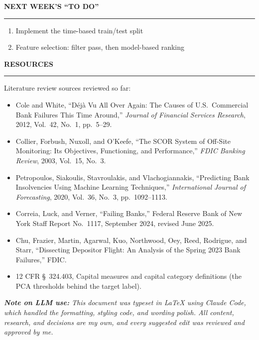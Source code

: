 \documentclass[11pt,letterpaper]{article}
\newcommand{\sectionhead}[1]{%
  \vspace{6pt}%
  {\sffamily\bfseries\fontsize{9.5}{12}\selectfont\color{navy}\MakeUppercase{#1}}\par
  \vspace{-9pt}\textcolor{hairline}{\rule{\textwidth}{0.5pt}}\par\vspace{0pt}}
\newcommand{\answer}[1]{#1\par\vspace{3pt}}
\begin{document}
\newpage
\sectionhead{Next week's ``To Do''}
\answer{\begin{enumerate}[topsep=1pt,itemsep=1pt,leftmargin=16pt,label=\textcolor{navy}{\bfseries\arabic*.}]
  \item Implement the time-based train/test split
  \item Feature selection: filter pass, then model-based ranking
\end{enumerate}}

\sectionhead{Resources}
\answer{Literature review sources reviewed so far:
\begin{itemize}[topsep=1pt,itemsep=1pt,leftmargin=14pt,label=\textcolor{navy}{\footnotesize\textbullet}]
  \item Cole and White, ``D\'{e}j\`{a} Vu All Over Again: The Causes of U.S.\ Commercial Bank Failures This Time Around,'' \textit{Journal of Financial Services Research}, 2012, Vol.\ 42, No.\ 1, pp.\ 5--29.
  \item Collier, Forbush, Nuxoll, and O'Keefe, ``The SCOR System of Off-Site Monitoring: Its Objectives, Functioning, and Performance,'' \textit{FDIC Banking Review}, 2003, Vol.\ 15, No.\ 3.
  \item Petropoulos, Siakoulis, Stavroulakis, and Vlachogiannakis, ``Predicting Bank Insolvencies Using Machine Learning Techniques,'' \textit{International Journal of Forecasting}, 2020, Vol.\ 36, No.\ 3, pp.\ 1092--1113.
  \item Correia, Luck, and Verner, ``Failing Banks,'' Federal Reserve Bank of New York Staff Report No.\ 1117, September 2024, revised June 2025.
  \item Chu, Frazier, Martin, Agarwal, Kuo, Northwood, Oey, Reed, Rodrigue, and Starr, ``Dissecting Depositor Flight: An Analysis of the Spring 2023 Bank Failures,'' FDIC.
  \item 12 CFR \S\ 324.403, Capital measures and capital category definitions (the PCA thresholds behind the target label).
\end{itemize}}

\vspace{2pt}
{\small\itshape\color{midgray}\textbf{Note on LLM use:} This document was typeset in LaTeX using Claude Code, which handled the formatting, styling code, and wording polish. All content, research, and decisions are my own, and every suggested edit was reviewed and approved by me.}
\end{document}
